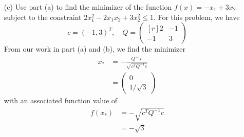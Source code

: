 \documentclass{article}
\begin{document}
\begin{itemize}
\begin{itemize}
        \item[(c)] Use part (a) to find the minimizer of the function $f(x) = -x_1 + 3x_2$ subject to the constraint $2x_1^2 - 2x_1x_2 + 3x_2^2 \leq 1$.
        \newline\newline
        For this problem, we have
        \[c = (-1,3)^T, \hspace{1em} Q = \begin{pmatrix*}[r]
            2 & -1\\
            -1 & 3
        \end{pmatrix*}\]
        From our work in part (a) and (b), we find the minimizer
        \begin{align*}
            x_* &= -\frac{Q^{-1}c}{\sqrt{c^TQ^{-1}c}}\\
            &= \begin{pmatrix}
                0\\
                1/\sqrt{3}
            \end{pmatrix}
        \end{align*}
        with an associated function value of
        \begin{align*}
            f(x_*) &= -\sqrt{c^TQ^{-1}c}\\
            &= -\sqrt{3}
        \end{align*}
        
    \end{itemize}
\end{itemize}
\end{document}
